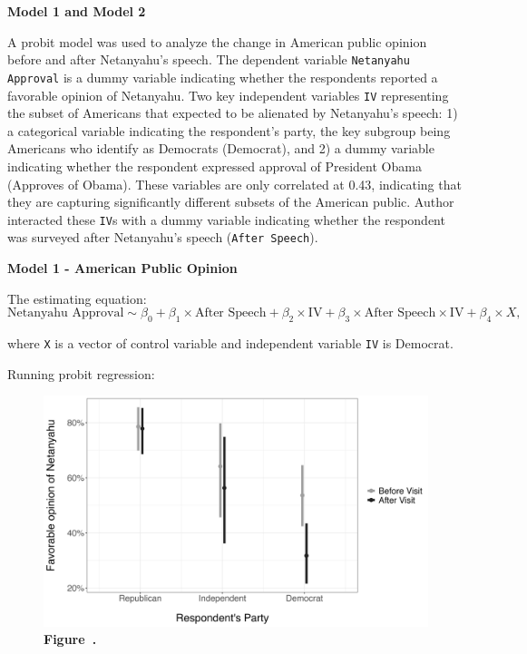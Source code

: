 \documentclass[12pt,letterpaper]{article}
\begin{document}
	\begin{center}
		\noindent \textbf{Model 1 and Model 2}
	\end{center}
	
A probit model was used to analyze the change in American public opinion before and after Netanyahu’s speech. The dependent variable \texttt{Netanyahu Approval} is a dummy variable indicating whether the respondents reported a favorable opinion of Netanyahu. Two key independent variables \texttt{IV} representing the subset of Americans that expected to be alienated by Netanyahu’s speech: 1) a categorical variable indicating the respondent’s party, the key subgroup being Americans who identify as Democrats (Democrat), and 2) a dummy variable indicating whether the respondent expressed approval of President Obama (Approves of Obama). These variables are only correlated at 0.43, indicating that they are capturing significantly different subsets of the American public. Author interacted these \texttt{IV}s with a dummy variable indicating whether the respondent was surveyed after Netanyahu’s speech (\texttt{After Speech}).
	
	\begin{center}
		\noindent \textbf{Model 1 - American Public Opinion}
	\end{center}
	
	\noindent The estimating equation:
	\begin{equation}
		\text{Netanyahu Approval} \sim \beta_{0} + \beta_{1} \times \text{After Speech} + \beta_{2} \times \text{IV} + \beta_{3} \times \text{After Speech} \times \text{IV} + \beta_{4} \times X,
	\end{equation}
	
	\noindent where \texttt{X} is a vector of control variable and independent variable \texttt{IV} is Democrat.
	
	\vspace{0.5cm}
	\noindent  Running probit regression:
	 
	
	\begin{figure}[H]
		\centering
		\includegraphics[width=1.0\textwidth]{figures_rep/Figure1.png}
		      \label{fig:your_figure_label} 
		  \textbf{Figure~\thefigure.}
	\end{figure}
	
\end{document}
